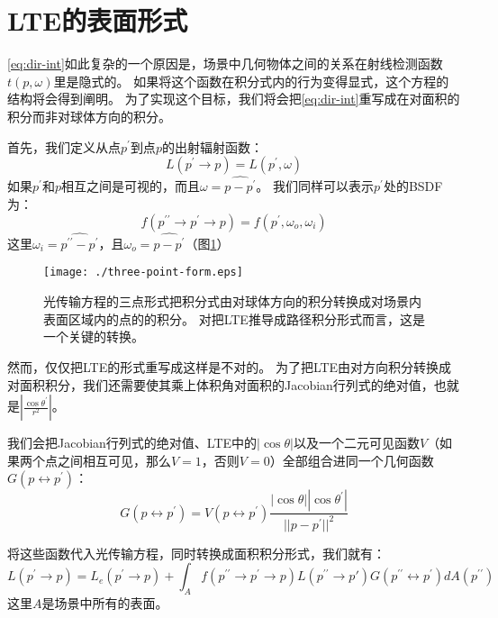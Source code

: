 \documentclass[a4paper]{article}
\begin{document}
	\section{LTE的表面形式}	
	\eqref{eq:dir-int}如此复杂的一个原因是，场景中几何物体之间的关系在射线检测函数$t(p,\omega)$里是隐式的。
	如果将这个函数在积分式内的行为变得显式，这个方程的结构将会得到阐明。
	为了实现这个目标，我们将会把\eqref{eq:dir-int}重写成在对面积的积分而非对球体方向的积分。

	首先，我们定义从点$p^\prime$到点$p$的出射辐射函数：
	\begin{equation*}
		L(p^\prime\rightarrow p)=L(p^\prime,\omega)
	\end{equation*}
	如果$p^\prime$和$p$相互之间是可视的，而且$\omega=\widehat{p - p^\prime}$。
	我们同样可以表示$p^\prime$处的BSDF为：
	\begin{equation*}
		f(p^{\prime\prime}\rightarrow p^\prime\rightarrow p)=f(p^\prime,\omega_o,\omega_i)
	\end{equation*}
	这里$\omega_i=\widehat{p^{\prime\prime}-p^\prime}$，且$\omega_o=\widehat{p-p^\prime}$（图\ref{fig:three-point-form}）
	\begin{figure}[h!]
		\begin{framed}
		\texttt{[image: ./three-point-form.eps]}
		\caption{光传输方程的三点形式把积分式由对球体方向的积分转换成对场景内表面区域内的点的的积分。
		对把LTE推导成路径积分形式而言，这是一个关键的转换。}
		\label{fig:three-point-form}
		\end{framed}
	\end{figure}

	然而，仅仅把LTE的形式重写成这样是不对的。
	为了把LTE由对方向积分转换成对面积积分，我们还需要使其乘上体积角对面积的Jacobian行列式的绝对值，也就是$|\frac{\cos\theta^\prime}{r^2}|$。

	我们会把Jacobian行列式的绝对值、LTE中的$|\cos\theta|$以及一个二元可见函数$V$（如果两个点之间相互可见，那么$V=1$，否则$V=0$）全部组合进同一个几何函数$G(p\leftrightarrow p^\prime)$：
	\begin{equation*}
		G(p\leftrightarrow p^{\prime})=V(p\leftrightarrow p^{\prime})\frac{|\cos\theta||\cos\theta^{\prime}|}{||p-p^{\prime}||^2}
		\label{eq:b}
	\end{equation*}

	将这些函数代入光传输方程，同时转换成面积积分形式，我们就有：
	\begin{equation}
		L(p^\prime \rightarrow p)=L_e(p^\prime\rightarrow p)+\int_A f(p^{\prime\prime} \rightarrow p^\prime \rightarrow p)L(p^{\prime\prime}\rightarrow p{\prime})G(p^{\prime\prime}\leftrightarrow p^\prime)dA(p^{\prime\prime})
		\label{eq:area-int}
	\end{equation}
	这里$A$是场景中所有的表面。
	
\end{document}
